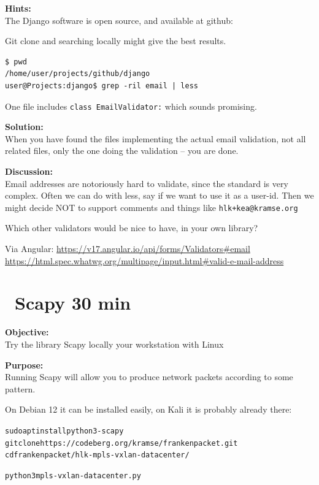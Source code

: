 \documentclass[a4paper,11pt,notitlepage]{report}
\begin{document}
{\bf Hints:}\\
The Django software is open source, and available at github:\\

Git clone and searching locally might give the best results.

\begin{verbatim}
$ pwd
/home/user/projects/github/django
user@Projects:django$ grep -ril email | less
\end{verbatim}

One file includes \verb+class EmailValidator:+ which sounds promising.


{\bf Solution:}\\
When you have found the files implementing the actual email validation, not all related files, only the one doing the validation -- you are done.

{\bf Discussion:}\\
Email addresses are notoriously hard to validate, since the standard is very complex. Often we can do with less, say if we want to use it as a user-id. Then we might decide NOT to support comments and things like \verb?hlk+kea@kramse.org?

Which other validators would be nice to have, in your own library?

Via Angular: \url{https://v17.angular.io/api/forms/Validators#email}\\
\url{https://html.spec.whatwg.org/multipage/input.html#valid-e-mail-address}



\chapter{\faInfoCircle\ Scapy 30 min}
\label{ex:scapy}

{\bf Objective:}\\
Try the library Scapy locally your workstation with Linux


{\bf Purpose:}\\
Running Scapy will allow you to produce network packets according to some pattern.

On Debian 12 it can be installed easily, on Kali it is probably already there:
\begin{alltt}\footnotesize
sudo apt install python3-scapy
git clone https://codeberg.org/kramse/frankenpacket.git
cd frankenpacket/hlk-mpls-vxlan-datacenter/

python3 mpls-vxlan-datacenter.py
\end{alltt}
\end{document}
